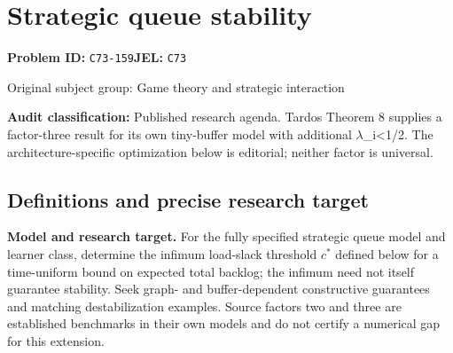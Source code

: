 \documentclass[11pt,a4paper]{article}
\begin{document}
\section*{Strategic queue stability}
\textbf{Problem ID:} \texttt{C73-159}\quad \textbf{JEL:} \texttt{C73}\par
\label{problem:OP-0286}
{\sffamily\small\color{muted}Original subject group: Game theory and strategic interaction\par}
\label{definitions:problem:30007568}
\textbf{Audit classification:} Published research agenda. Tardos Theorem 8 supplies a factor-three result for its own tiny-buffer model with additional \ensuremath{\lambda}\_i<1/2. The architecture-specific optimization below is editorial; neither factor is universal.
\subsection*{Definitions and precise research target}
\textbf{Model and research target.} For the fully specified strategic queue model and learner class, determine the infimum load-slack threshold \(c^*\) defined below for a time-uniform bound on expected total backlog; the infimum need not itself guarantee stability. Seek graph- and buffer-dependent constructive guarantees and matching destabilization examples. Source factors two and three are established benchmarks in their own models and do not certify a numerical gap for this extension.
\end{document}
